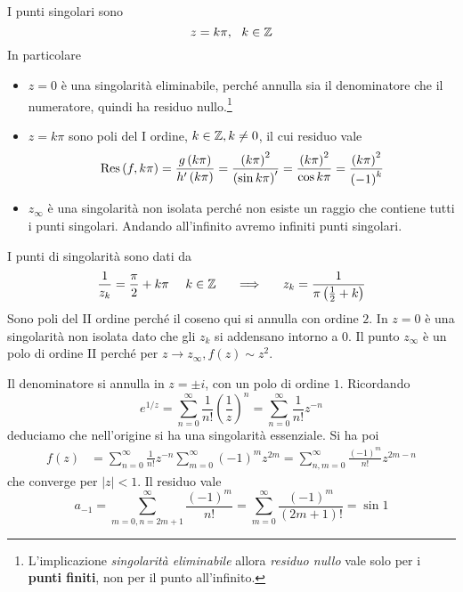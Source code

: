 I punti singolari sono
\begin{equation*}
z=k\pi ,\ \ k\in \mathbb{Z} 
\end{equation*}
In particolare
\begin{itemize}
\item $z=0$ è una singolarità eliminabile, perché annulla sia il denominatore che il numeratore, quindi ha residuo nullo.\footnote{L'implicazione \textit{singolarità eliminabile} allora \textit{residuo nullo} vale solo per i \textbf{punti finiti}, non per il punto all'infinito.}
\item $z=k\pi $ sono poli del I ordine, $k\in \mathbb{Z}  ,k\neq 0$, il cui residuo vale\begin{equation*}
\operatorname{Res} \left( f,k\pi \right) =\frac{g\left( k\pi \right)}{h'\left( k\pi \right)} =\frac{\left( k\pi \right)^{2}}{\left(\sin k\pi \right) '} =\frac{\left( k\pi \right)^{2}}{\cos k\pi } =\frac{\left( k\pi \right)^{2}}{\left( -1\right)^{k}}
\end{equation*}
\item $z_{\infty }$ è una singolarità non isolata perché non esiste un raggio che contiene tutti i punti singolari. Andando all'infinito avremo infiniti punti singolari.
\end{itemize}
\Soluzione

I punti di singolarità sono dati da
\begin{equation*}
\frac{1}{z_{k}} =\frac{\pi }{2} +k\pi \ \ \ \ k\in \ZZ  \ \ \ \ \implies \ \ \ \ z_{k} =\frac{1}{\pi \left(\frac{1}{2} +k\right)}
\end{equation*}
Sono poli del II ordine perché il coseno qui si annulla con ordine $2$. In $z=0$ è una singolarità non isolata dato che gli $z_{k}$ si addensano intorno a $0$. Il punto $z_{\infty }$ è un polo di ordine II perché per $z\rightarrow z_{\infty } ,f\left( z\right) \sim z^{2}$.
\Soluzione

Il denominatore si annulla in $z=\pm i$, con un polo di ordine $1$. Ricordando
\begin{equation*}
e^{1/z} =\sum\limits ^{\infty }_{n=0}\frac{1}{n!}\left(\frac{1}{z}\right)^{n} =\sum\limits ^{\infty }_{n=0}\frac{1}{n!} z^{-n}
\end{equation*}
deduciamo che nell'origine si ha una singolarità essenziale. Si ha poi
\begin{align*}
f\left( z\right) & =\sum\limits ^{\infty }_{n=0}\frac{1}{n!} z^{-n}\sum\limits ^{\infty }_{m=0}\left( -1\right)^{m} z^{2m} =\sum\limits ^{\infty }_{n,m=0}\frac{\left( -1\right)^{m}}{n!} z^{2m-n}
\end{align*}
che converge per $\left| z\right| < 1$. Il residuo vale
\begin{equation*}
a_{-1} =\sum\limits ^{\infty }_{m=0,n=2m+1}\frac{\left( -1\right)^{m}}{n!} =\sum\limits ^{\infty }_{m=0}\frac{\left( -1\right)^{m}}{\left( 2m+1\right) !} =\sin 1
\end{equation*}
\Soluzione

